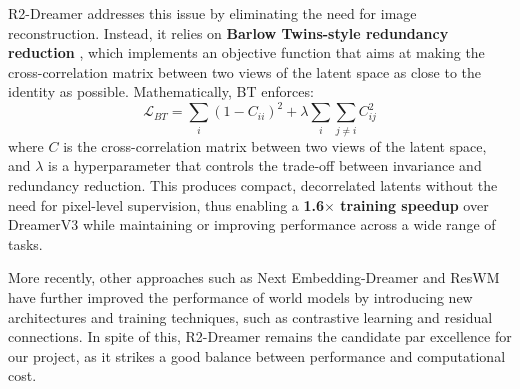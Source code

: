 \documentclass{article}
\begin{document}
R2-Dreamer \cite{morihira2026r2dreamer} addresses this issue by eliminating the need for image reconstruction. Instead, it relies on \textbf{Barlow Twins-style redundancy reduction} \cite{zbontar2021barlow}, which implements an objective function that aims at making the cross-correlation matrix between two views of the latent space as close to the identity as possible. Mathematically, BT enforces:
\begin{equation}
    \mathcal{L}_{BT} = \sum_{i} (1 - C_{ii})^2 + \lambda \sum_{i} \sum_{j \neq i} C_{ij}^2
\end{equation}
where $C$ is the cross-correlation matrix between two views of the latent space, and $\lambda$ is a hyperparameter that controls the trade-off between invariance and redundancy reduction. This produces compact, decorrelated latents without the need for pixel-level supervision, thus enabling a \textbf{1.6$\times$ training speedup} over DreamerV3 while maintaining or improving performance across a wide range of tasks.

More recently, other approaches such as Next Embedding-Dreamer \cite{nedreamer2026} and ResWM \cite{reswm2026} have further improved the performance of world models by introducing new architectures and training techniques, such as contrastive learning and residual connections. In spite of this, R2-Dreamer remains the candidate par excellence for our project, as it strikes a good balance between performance and computational cost.


\end{document}
